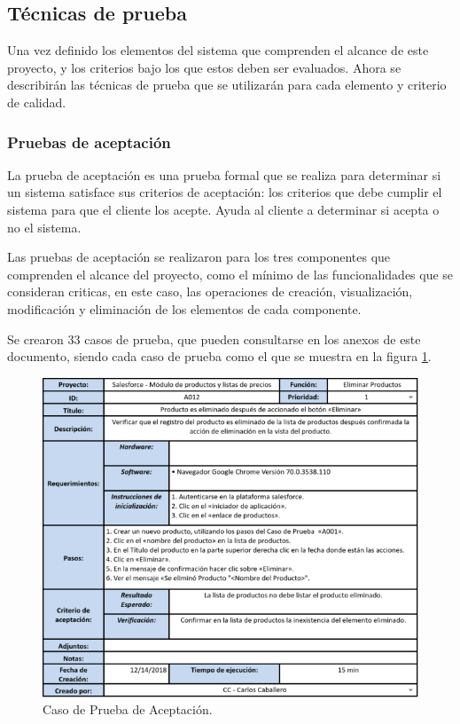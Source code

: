 \subsection{Técnicas de prueba}
Una vez definido los elementos del sistema que comprenden el alcance de este
proyecto, y los criterios bajo los que estos deben ser evaluados. Ahora se
describirán las técnicas de prueba que se utilizarán para cada elemento y
criterio de calidad.

\subsubsection{Pruebas de aceptación}
La prueba de aceptación es una prueba formal que se realiza para determinar si
un sistema satisface sus criterios de aceptación: los criterios que debe cumplir
el sistema para que el cliente los acepte. Ayuda al cliente a determinar si
acepta o no el sistema\cite{Naik}.

Las pruebas de aceptación se realizaron para los tres componentes que comprenden
el alcance del proyecto, como el mínimo de las funcionalidades que se consideran
criticas, en este caso, las operaciones de creación, visualización, modificación
y eliminación de los elementos de cada componente.

Se crearon 33 casos de prueba, que pueden consultarse en los anexos de este
documento, siendo cada caso de prueba como el que se muestra en la figura
\ref{tc_acceptance}.

\begin{figure}
\centering
\includegraphics[width=1.0\textwidth]{graphics/tc1-acceptance.eps}
\caption{Caso de Prueba de Aceptación.}
\label{tc_acceptance}
\end{figure}

